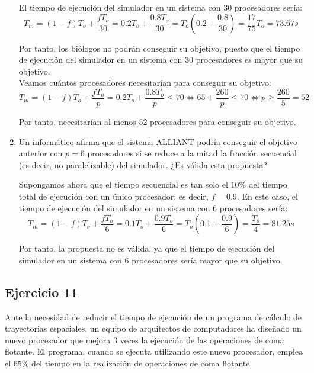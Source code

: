 \begin{enumerate}
    El tiempo de ejecución del simulador en un sistema con 30 procesadores sería:
    \begin{equation*}
        T_m = (1-f)T_o + \dfrac{fT_o}{30} = 0.2T_o + \dfrac{0.8T_o}{30} = T_o\left(0.2 + \dfrac{0.8}{30}\right) = \dfrac{17}{75}T_o = 73.67s
    \end{equation*}

    Por tanto, los biólogos no podrán conseguir su objetivo, puesto que el tiempo de ejecución del simulador en un sistema con 30 procesadores es mayor que su objetivo.\\

    Veamos cuántos procesadores necesitarían para conseguir su objetivo:
    \begin{equation*}
        T_m = (1-f)T_o + \dfrac{fT_o}{p} = 0.2T_o + \dfrac{0.8T_o}{p}\leq 70\iff
        65+\dfrac{260}{p}\leq 70\iff p\geq \dfrac{260}{5} = 52
    \end{equation*}

    Por tanto, necesitarían al menos 52 procesadores para conseguir su objetivo.
    \item Un informático afirma que el sistema ALLIANT podría conseguir el objetivo anterior con $p = 6$ procesadores si se reduce a la mitad la fracción secuencial (es decir, no paralelizable) del simulador. ¿Es válida esta propuesta?
    
    Supongamos ahora que el tiempo secuencial es tan solo el $10\%$ del tiempo total de ejecución con un único procesador; es decir, $f = 0.9$. En este caso, el tiempo de ejecución del simulador en un sistema con 6 procesadores sería:
    \begin{equation*}
        T_m = (1-f)T_o + \dfrac{fT_o}{6} = 0.1T_o + \dfrac{0.9T_o}{6} = T_o\left(0.1 + \dfrac{0.9}{6}\right) = \dfrac{T_o}{4} = 81.25s
    \end{equation*}

    Por tanto, la propuesta no es válida, ya que el tiempo de ejecución del simulador en un sistema con 6 procesadores sería mayor que su objetivo.
\end{enumerate}

\subsection*{Ejercicio 11}
Ante la necesidad de reducir el tiempo de ejecución de un programa de cálculo de trayectorias espaciales, un equipo de arquitectos de computadores ha diseñado un nuevo procesador que mejora 3 veces la ejecución de las operaciones de coma flotante. El programa, cuando se ejecuta utilizando este nuevo procesador, emplea el 65\% del tiempo en la realización de operaciones de coma flotante.


